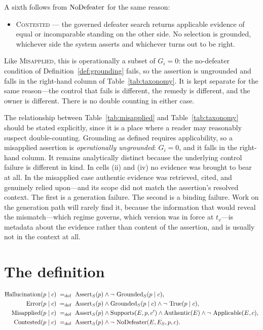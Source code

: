 A sixth follows from $\operatorname{NoDefeater}$ for the same reason:

\begin{itemize}
  \item[\textsc{(vi)}] \textsc{Contested} --- the governed defeater search returns
        applicable evidence of equal or incomparable standing on the other side. No
        selection is grounded, whichever side the system asserts and whichever turns out
        to be right.
\end{itemize}

Like \textsc{Misapplied}, this is operationally a subset of $G_i = 0$: the no-defeater
condition of Definition~\ref{def:grounding} fails, so the assertion is ungrounded and
falls in the right-hand column of Table~\ref{tab:taxonomy}. It is kept separate for the
same reason---the control that fails is different, the remedy is different, and the
owner is different. There is no double counting in either case.

The relationship between Table~\ref{tab:misapplied} and Table~\ref{tab:taxonomy}
should be stated explicitly, since it is a place where a reader may reasonably
suspect double-counting. Grounding as defined requires applicability, so a
misapplied assertion is \emph{operationally ungrounded}: $G_i = 0$, and it falls in
the right-hand column. It remains analytically distinct because the underlying
control failure is different in kind. In cells (ii) and (iv) no evidence was
brought to bear at all. In the misapplied case authentic evidence was retrieved,
cited, and genuinely relied upon---and its scope did not match the assertion's
resolved context. The first is a generation failure. The second is a binding
failure. Work on the generation path will rarely find it, because the information that
would reveal the mismatch---which regime governs, which version was in force at
$t_v$---is metadata about the evidence rather than content of the assertion, and is
usually not in the context at all.

\section{The definition}
\label{sec:hall-def}

\begin{definition}
\label{def:hallucination}
\begin{align}
  \operatorname{Hallucination}(p \mid c)       &\;=_{\mathrm{def}}\; \operatorname{Assert}_S(p) \wedge \neg\,\operatorname{Grounded}_S(p \mid c), \label{eq:hall}\\
  \operatorname{Error}(p \mid c)        &\;=_{\mathrm{def}}\; \operatorname{Assert}_S(p) \wedge \operatorname{Grounded}_S(p \mid c)
                           \wedge \neg\,\operatorname{True}(p \mid c), \label{eq:err}\\
  \operatorname{Misapplied}(p \mid c) &\;=_{\mathrm{def}}\; \operatorname{Assert}_S(p) \wedge \operatorname{Supports}(E, p, c')
                           \wedge \operatorname{Authentic}(E) \wedge \neg\,\operatorname{Applicable}(E, c),
                           \label{eq:misapplied}\\
  \operatorname{Contested}(p \mid c)  &\;=_{\mathrm{def}}\; \operatorname{Assert}_S(p) \wedge \neg\,\operatorname{NoDefeater}(E, E_S, p, c).
                           \label{eq:contested}
\end{align}
\end{definition}

